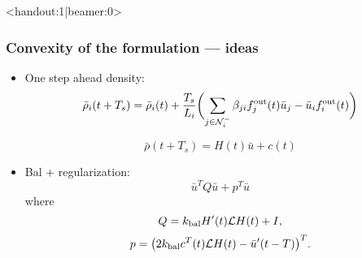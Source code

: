 
\begin{frame}<handout:1|beamer:0>
\frametitle{Convexity of the formulation --- ideas}
    \newcommand*\colF{} 
    \only<2>{\renewcommand*\colF{\textcolor{red}}}
    \newcommand*\colQ{} 
    \only<3>{\renewcommand*\colQ{\textcolor{orange}}}
    \newcommand*\colp{} 
    \only<4>{\renewcommand*\colp{\textcolor{blue}}}        
    \begin{itemize}
    \item One step ahead density:
    \begin{equation}
    \bar{\rho}_i(t+T_s) = \bar{\rho}_i(t) + \frac{T_s}{L_i}\bigg(\colF{\sum_{j\in\neighUp_i} \beta_{ji} f^\text{out}_j(t)}\bar{u}_j - \bar{u}_i \colF{f^\text{out}_i(t)}\bigg)
    \end{equation}
    
    \begin{equation}
    \bar{\rho}(t+T_s) = \colF{H(t)} \bar{u} + c(t)
    \end{equation}
    
    \item Bal + regularization:
    \begin{equation}
    \bar{u}^T \colQ{Q} \bar{u} + \colp{p^T} \bar{u}
    \end{equation}
    where
    \begin{equation}
    \colQ{Q = k_\text{bal}H'(t)\laplacian H(t) + I,}
    \end{equation}
    \begin{equation}
    \colp{p = \big( 2 k_\text{bal}c^T(t)\laplacian H(t) - \bar{u}'(t-T) \big)^T.}
    \end{equation}
    \end{itemize}
\end{frame}